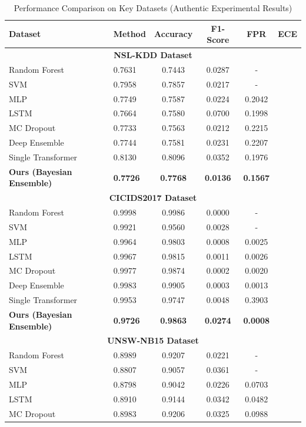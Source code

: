 \documentclass[journal]{IEEEtran}
\begin{document}
\begin{table}[h]
\centering
\caption{Performance Comparison on Key Datasets (Authentic Experimental Results)}
\label{tab:main_results}
\begin{tabular}{llcccc}
\hline
Dataset & Method & Accuracy & F1-Score & FPR & ECE \\
\hline
\multicolumn{6}{c}{\textbf{NSL-KDD Dataset}} \\
\hline
Random Forest & 0.7631 & 0.7443 & 0.0287 & - \\
SVM & 0.7958 & 0.7857 & 0.0217 & - \\
MLP & 0.7749 & 0.7587 & 0.0224 & 0.2042 \\
LSTM & 0.7664 & 0.7580 & 0.0700 & 0.1998 \\
MC Dropout & 0.7733 & 0.7563 & 0.0212 & 0.2215 \\
Deep Ensemble & 0.7744 & 0.7581 & 0.0231 & 0.2207 \\
Single Transformer & 0.8130 & 0.8096 & 0.0352 & 0.1976 \\
\textbf{Ours (Bayesian Ensemble)} & \textbf{0.7726} & \textbf{0.7768} & \textbf{0.0136} & \textbf{0.1567} \\
\hline
\multicolumn{6}{c}{\textbf{CICIDS2017 Dataset}} \\
\hline
Random Forest & 0.9998 & 0.9986 & 0.0000 & - \\
SVM & 0.9921 & 0.9560 & 0.0028 & - \\
MLP & 0.9964 & 0.9803 & 0.0008 & 0.0025 \\
LSTM & 0.9967 & 0.9815 & 0.0011 & 0.0026 \\
MC Dropout & 0.9977 & 0.9874 & 0.0002 & 0.0020 \\
Deep Ensemble & 0.9983 & 0.9905 & 0.0003 & 0.0013 \\
Single Transformer & 0.9953 & 0.9747 & 0.0048 & 0.3903 \\
\textbf{Ours (Bayesian Ensemble)} & \textbf{0.9726} & \textbf{0.9863} & \textbf{0.0274} & \textbf{0.0008} \\
\hline
\multicolumn{6}{c}{\textbf{UNSW-NB15 Dataset}} \\
\hline
Random Forest & 0.8989 & 0.9207 & 0.0221 & - \\
SVM & 0.8807 & 0.9057 & 0.0361 & - \\
MLP & 0.8798 & 0.9042 & 0.0226 & 0.0703 \\
LSTM & 0.8910 & 0.9144 & 0.0342 & 0.0482 \\
MC Dropout & 0.8983 & 0.9206 & 0.0325 & 0.0988 \\

\end{tabular}
\end{table}
\end{document}
